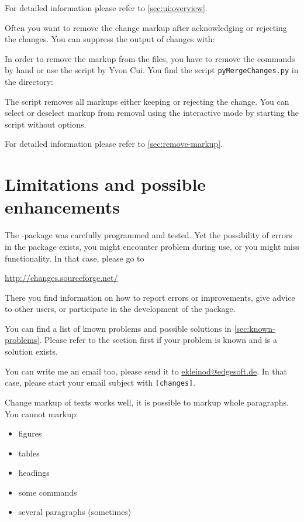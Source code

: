 For detailed information please refer to \autoref{sec:ui:overview}.



Often you want to remove the change markup after acknowledging or rejecting the changes.
You can suppress the output of changes with:


In order to remove the markup from the  files, you have to remove the commands by hand or use the script by Yvon Cui.
You find the script \texttt{pyMergeChanges.py} in the directory:


The script removes all markups either keeping or rejecting the change.
You can select or deselect markup from removal using the interactive mode by starting the script without options.

For detailed information please refer to \autoref{sec:remove-markup}.




\cleardoublepage
\section{Limitations and possible enhancements}
\label{sec:limitations}

The -package was carefully programmed and tested.
Yet the possibility of errors in the package exists, you might encounter problem during use, or you might miss functionality.
In that case, please go to

\url{http://changes.sourceforge.net/}

There you find information on how to report errors or improvements, give advice to other users, or participate in the development of the package.

You can find a list of known problems and possible solutions in \autoref{sec:known-problems}.
Please refer to the section first if your problem is known and is a solution exists.

You can write me an email too, please send it to \href{mailto:ekleinod@edgesoft.de}{ekleinod@edgesoft.de}.
In that case, please start your email subject with \texttt{[changes]}.

Change markup of texts works well, it is possible to markup whole paragraphs.
You cannot markup:

\begin{itemize}
	\item figures
	\item tables
	\item headings
	\item some commands
	\item several paragraphs (sometimes)
\end{itemize}

